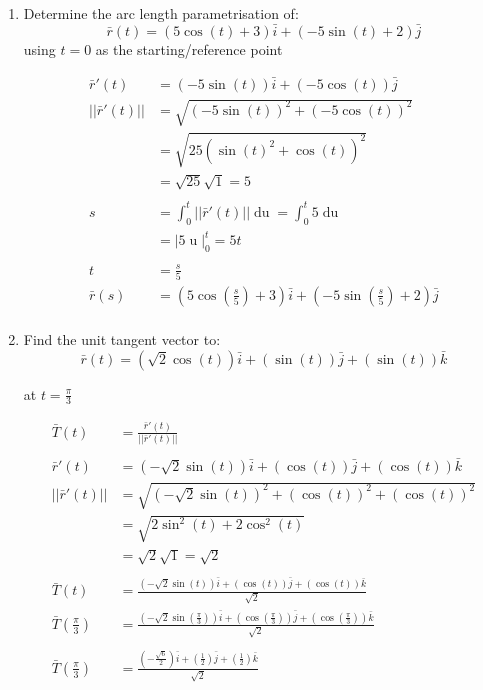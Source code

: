 \documentclass[a4paper,11pt]{article}
\begin{document}
\begin{preview}
\begin{enumerate}
\begin{enumerate}
        \item  Determine the arc length parametrisation of:
        $$ \bar{r}(t) = (5\cos(t) + 3)\bar{i} + (-5\sin(t) + 2)\bar{j} $$
        using $t = 0$ as the starting/reference point

        \begin{align*}
            \bar{r}'(t) &= (-5\sin(t))\bar{i} + (-5\cos(t))\bar{j}\\
            || \bar{r}'(t) || &= \sqrt{(-5\sin(t))^2 + (-5\cos(t))^2}\\
            &= \sqrt{25(\sin(t)^2 + \cos(t))^2}\\
            &= \sqrt{25}\sqrt{1} = 5\\\\
            s &= \int^t_0 || \bar{r}'(t) ||\operatorname{du} = \int^t_0 5 \operatorname{du}\\
            &= \Big| 5\operatorname{u} \Big|^t_0 = 5t\\\\
            t &= \frac{s}{5}\\
            \bar{r}(s) &= \left(5\cos\left(\frac{s}{5}\right) + 3\right)\bar{i} + \left(-5\sin\left(\frac{s}{5}\right) + 2\right) \bar{j}\\
        \end{align*}

        \item Find the unit tangent vector to:
        $$ \bar{r}(t) = (\sqrt{2}\cos(t))\bar{i} + (\sin(t))\bar{j} + (\sin(t))\bar{k} $$

        at $t = \frac{\pi}{3}$

        \begin{align*}
            \bar{T}(t) &= \frac{\bar{r}'(t)}{|| \bar{r}'(t) ||}\\\\
            \bar{r}'(t) &= (- \sqrt{2}\sin(t))\bar{i} + (\cos(t))\bar{j} + (\cos(t))\bar{k}\\
            || \bar{r}'(t) || &= \sqrt{(- \sqrt{2}\sin(t))^2 + (\cos(t))^2+ (\cos(t))^2}\\
            &= \sqrt{2 \sin^2(t) + 2 \cos^2(t)}\\
            &= \sqrt{2}\sqrt{1} = \sqrt{2}\\\\
            \bar{T}(t) &= \frac{(- \sqrt{2}\sin(t))\bar{i} + (\cos(t))\bar{j} + (\cos(t))\bar{k}}{\sqrt{2}}\\
            \bar{T}\left(\frac{\pi}{3}\right) &= \frac{(- \sqrt{2}\sin(\frac{\pi}{3}))\bar{i} + (\cos(\frac{\pi}{3}))\bar{j} + (\cos(\frac{\pi}{3}))\bar{k}}{\sqrt{2}}\\\\
            \bar{T}\left(\frac{\pi}{3}\right) &= \frac{\left( -\frac{\sqrt{6}}{2} \right) \bar{i} + \left(\frac{1}{2}\right) \bar{j} + \left(\frac{1}{2}\right)\bar{k} }{\sqrt{2}}
        \end{align*}


\end{enumerate}
\end{enumerate}
\end{preview}
\end{document}
